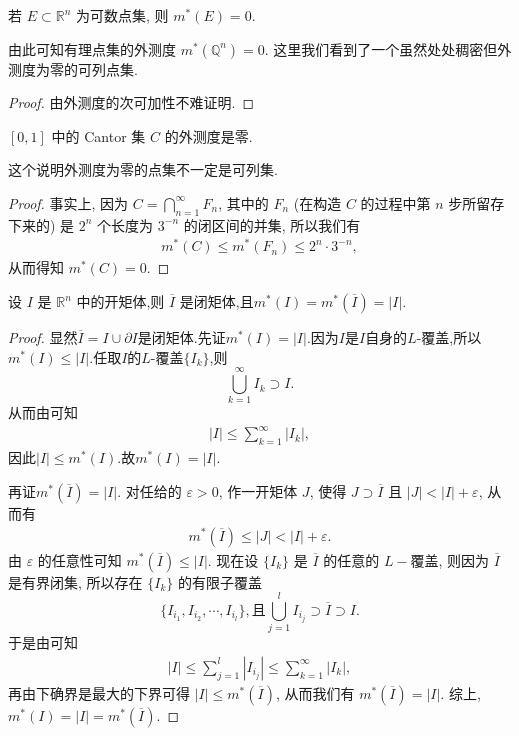 \documentclass[../../main.tex]{subfiles}
\begin{document}
\begin{corollary}
若 \(E \subset \mathbb{R}^n\) 为可数点集, 则 \(m^*(E) = 0\).
\end{corollary}
\begin{remark}
由此可知有理点集的外测度 \(m^*(\mathbb{Q}^n)=0\). 这里我们看到了一个虽然处处稠密但外测度为零的可列点集.
\end{remark}
\begin{proof}
由外测度的次可加性不难证明.
\end{proof}

\begin{proposition}\label{proposition:Cantor集的外测度是零}
\([0,1]\) 中的 Cantor 集 \(C\) 的外测度是零.
\end{proposition}
\begin{remark}
这个说明外测度为零的点集不一定是可列集.
\end{remark}
\begin{proof}
事实上, 因为 \(C = \bigcap_{n = 1}^{\infty} F_n\), 其中的 \(F_n\) (在构造 \(C\) 的过程中第 \(n\) 步所留存下来的) 是 \(2^n\) 个长度为 \(3^{-n}\) 的闭区间的并集, 所以我们有
\begin{align*}
m^*(C) \leq m^*(F_n) \leq 2^n \cdot 3^{-n},
\end{align*}
从而得知 \(m^*(C)=0\). 
\end{proof}

\begin{proposition}
设 \(I\) 是 \(\mathbb{R}^n\) 中的开矩体,则  \(\overline{I}\) 是闭矩体,且\(m^*(I) = m^*(\overline{I}) = |I|\). 
\end{proposition}
\begin{proof}
显然$\overline{I}=I\cup \partial I$是闭矩体.先证$m^*(I)=|I|$.因为$I$是$I$自身的$L$-覆盖,所以$m^*(I)\leqslant |I|$.任取$I$的$L$-覆盖$\{I_k\}$,则
\[
\bigcup_{k = 1}^{\infty} I_{k} \supset I.
\]
从而由可知
\begin{align*}
|I| \leqslant \sum_{k = 1}^{\infty} |I_k|,
\end{align*}
因此\(|I| \leqslant m^*(I)\).故$m^*(I)=|I|.$

再证$m^*(\overline{I})=|I|$.
对任给的 \(\varepsilon > 0\), 作一开矩体 \(J\), 使得 \(J \supset \overline{I}\) 且 \(|J| < |I| + \varepsilon\), 从而有
\begin{align*}
m^*(\overline{I}) \leq |J| < |I| + \varepsilon.
\end{align*}
由 \(\varepsilon\) 的任意性可知 \(m^*(\overline{I}) \leq |I|\). 现在设 \(\{I_k\}\) 是 \(\overline{I}\) 的任意的 \(L -\)覆盖, 则因为 \(\overline{I}\) 是有界闭集, 所以存在 \(\{I_k\}\) 的有限子覆盖
\[
\{I_{i_1}, I_{i_2}, \cdots, I_{i_l}\},\text{且}\bigcup_{j = 1}^l I_{i_j} \supset \overline{I}\supset I.
\]
于是由可知
\begin{align*}
|I| \leq \sum_{j = 1}^l |I_{i_j}| \leq \sum_{k = 1}^{\infty} |I_k|,
\end{align*}
再由下确界是最大的下界可得 \(|I| \leq m^*(\overline{I})\), 从而我们有 \(m^*(\overline{I}) = |I|\). 
综上,$m^*(I)=|I|=m^*(\overline{I})$.
\end{proof}
\end{document}
